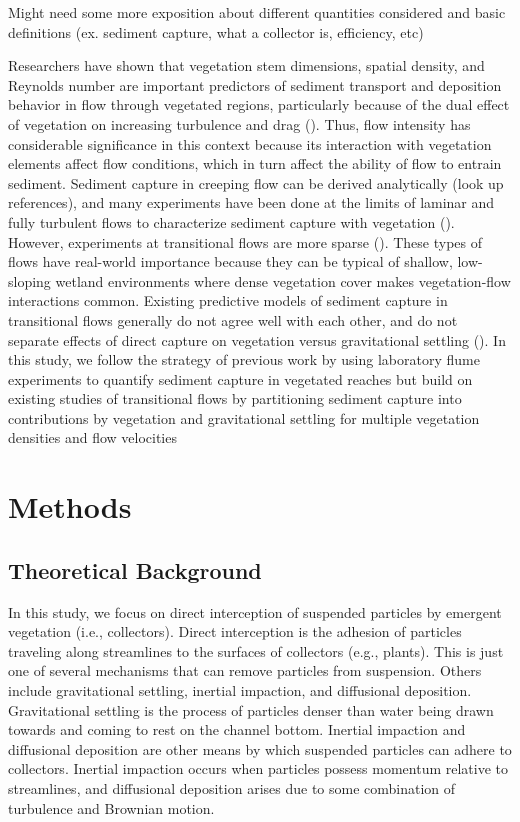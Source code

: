 \documentclass{scrreprt}
\begin{document}
Might need some more exposition about different quantities considered and basic definitions (ex. sediment capture, what a collector is, efficiency, etc)

Researchers have shown that vegetation stem dimensions, spatial density, and Reynolds number are important predictors of sediment transport and deposition behavior in flow through vegetated regions, particularly because of the dual effect of vegetation on increasing turbulence and drag (\cite{Fauria_2015, nepf_drag_1999, Palmer_2004}). Thus, flow intensity has considerable significance in this context because its interaction with vegetation elements affect flow conditions, which in turn affect the ability of flow to entrain sediment. Sediment capture in creeping flow can be derived analytically (look up references), and many experiments have been done at the limits of laminar and fully turbulent flows to characterize sediment capture with vegetation (\cite{Shan_turbulence_2020, Wu_2011, Yang_2016}). However, experiments at transitional flows are more sparse (\cite{Fauria_2015, Palmer_2004, Purich_2007}). These types of flows have real-world importance because they can be typical of shallow, low-sloping wetland environments where dense vegetation cover makes vegetation-flow interactions common. Existing predictive models of sediment capture in transitional flows generally do not agree well with each other, and do not separate effects of direct capture on vegetation versus gravitational settling (\cite{Fauria_2015, Palmer_2004}). In this study, we follow the strategy of previous work by using laboratory flume experiments to quantify sediment capture in vegetated reaches but build on existing studies of transitional flows by partitioning sediment capture into contributions by vegetation and gravitational settling for multiple vegetation densities and flow velocities 


\chapter{Methods}

\section{Theoretical Background}

In this study, we focus on direct interception of suspended particles by emergent vegetation (i.e., collectors). Direct interception is the adhesion of particles traveling along streamlines to the surfaces of collectors (e.g., plants). This is just one of several mechanisms that can remove particles from suspension. Others include gravitational settling, inertial impaction, and diffusional deposition. Gravitational settling is the process of particles denser than water being drawn towards and coming to rest on the channel bottom. Inertial impaction and diffusional deposition are other means by which suspended particles can adhere to collectors. Inertial impaction occurs when particles possess momentum relative to streamlines, and diffusional deposition arises due to some combination of turbulence and Brownian motion.
\end{document}

